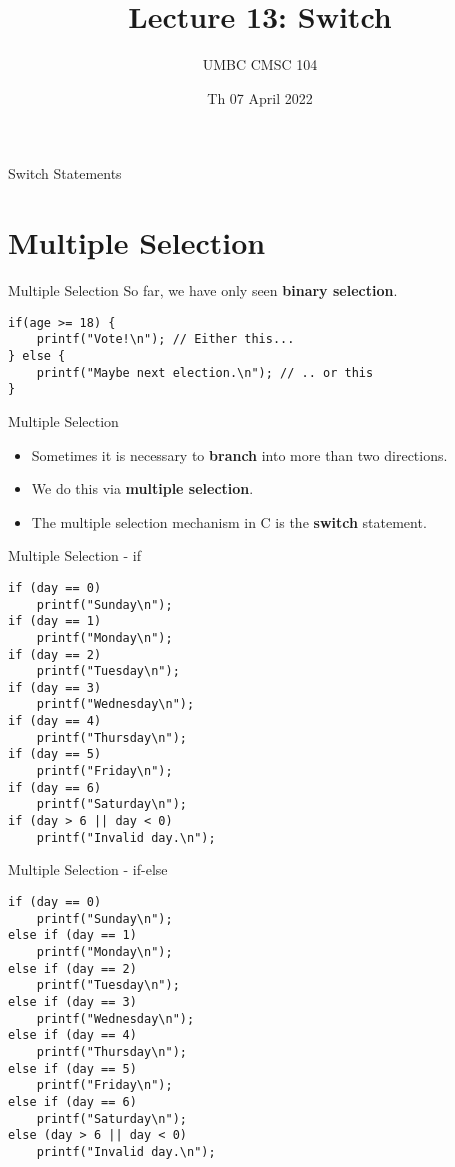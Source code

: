 \documentclass[graphics]{beamer}
\title{Lecture 13: Switch}
\author{UMBC CMSC 104}
\date{Th 07 April 2022}
\begin{document}
\begin{frame}{}
\centering
    Switch Statements
\end{frame}

\frame{\tableofcontents}

\section{Multiple Selection}
\begin{frame}[fragile]{Multiple Selection}
    So far, we have only seen \textbf{binary selection}.
    \begin{verbatim}
if(age >= 18) {
    printf("Vote!\n"); // Either this...
} else {
    printf("Maybe next election.\n"); // .. or this
}
    \end{verbatim}
\end{frame}

\begin{frame}{Multiple Selection}
    \begin{itemize}
        \item Sometimes it is necessary to \textbf{branch} into more than two directions.
        \item We do this via \textbf{multiple selection}.
        \item The multiple selection mechanism in C is the \textbf{switch} statement.
    \end{itemize}
\end{frame}

\begin{frame}[fragile]{Multiple Selection - if}
    \begin{verbatim}
if (day == 0)
    printf("Sunday\n");
if (day == 1)
    printf("Monday\n");
if (day == 2)
    printf("Tuesday\n");
if (day == 3)
    printf("Wednesday\n");
if (day == 4)
    printf("Thursday\n");
if (day == 5)
    printf("Friday\n");
if (day == 6)
    printf("Saturday\n");
if (day > 6 || day < 0)
    printf("Invalid day.\n");
    \end{verbatim}
\end{frame}

\begin{frame}[fragile]{Multiple Selection - if-else}
    \begin{verbatim}
if (day == 0)
    printf("Sunday\n");
else if (day == 1)
    printf("Monday\n");
else if (day == 2)
    printf("Tuesday\n");
else if (day == 3)
    printf("Wednesday\n");
else if (day == 4)
    printf("Thursday\n");
else if (day == 5)
    printf("Friday\n");
else if (day == 6)
    printf("Saturday\n");
else (day > 6 || day < 0)
    printf("Invalid day.\n");
    \end{verbatim}
\end{frame}
\end{document}
